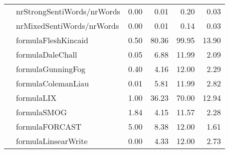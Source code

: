 \begin{tabular}{|l|l|r|r|r|r|}
 & nrStrongSentiWords/nrWords & 0.00 & 0.01 & 0.20 & 0.03 \\ \cline{2-6}
 & nrMixedSentiWords/nrWords & 0.00 & 0.01 & 0.14 & 0.03 \\ \hline
\parbox[t]{2mm}{} & formulaFleshKincaid & 0.50 & 80.36 & 99.95 & 13.90 \\ 
 & formulaDaleChall & 0.05 & 6.88 & 11.99 & 2.09 \\ 
 & formulaGunningFog & 0.40 & 4.16 & 12.00 & 2.29 \\ 
 & formulaColemanLiau & 0.01 & 5.81 & 11.99 & 2.82 \\ 
 & formulaLIX & 1.00 & 36.23 & 70.00 & 12.94 \\ 
 & formulaSMOG & 1.84 & 4.15 & 11.57 & 2.28 \\ 
 & formulaFORCAST & 5.00 & 8.38 & 12.00 & 1.61 \\ 
 & formulaLinsearWrite & 0.00 & 4.33 & 12.00 & 2.73 \\ \hline
\end{tabular}